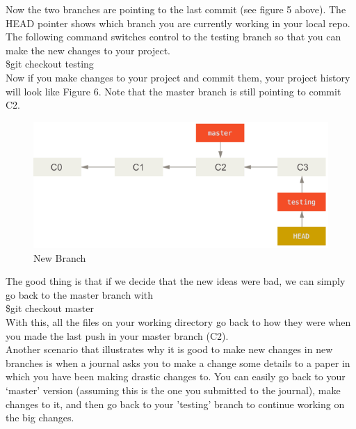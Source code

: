 \documentclass{article}
\begin{document}
    \vspace{0.2 in}
    Now the two branches are pointing to the last commit (see figure 5 above). The HEAD pointer shows which branch you are currently working in your local repo.
    The following command switches control to the testing branch so that you can make the new changes to your project. \\
    \newline
    \indent \$git checkout testing \\
    \newline
    Now if you make changes to your project and commit them, your project history will look like Figure 6. Note that the master branch is still pointing to commit C2.
    \vspace{0.2 in}
    \begin{figure}[h]
    	\caption{New Branch}
    	\includegraphics[scale=0.5]{images/figure6.png}
    	\centering
    \end{figure} 
    \vspace{0.2 in}
    The good thing is that if we decide that the new ideas were bad, we can simply go back to the master branch with \\
    \newline
    \indent \$git checkout master \\
    \newline
    With this, all the files on your working directory go back to how they were when you made the last push in your master branch (C2). \\
    \newline
    Another scenario that illustrates why it is good to make new changes in new branches is when a journal asks you to make a change some details to a paper in which you have been making drastic changes to. You can easily go back to your `master' version (assuming this is the one you submitted to the journal), make changes to it, and then go back to your 'testing' branch to continue working on the big changes.
\end{document}
